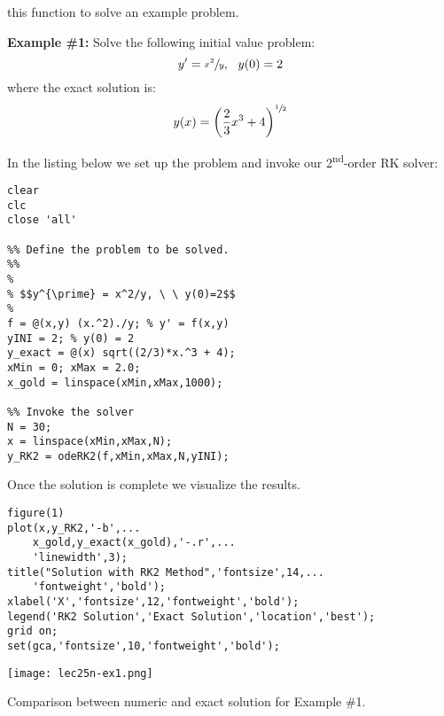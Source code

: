  this function to solve an example problem.

\vspace{0.25cm}

\noindent\textbf{Example \#1:} Solve the following initial value problem:
\begin{equation*}
y^{\prime} = \sfrac{x^2}{y}, \ \ y(0) = 2 
\end{equation*}
where the exact solution is: 
\begin{equation*}
y(x) = \left(\frac{2}{3}x^3 + 4\right)^{\sfrac{1}{2}}
\end{equation*}

\noindent In the listing below we set up the problem and invoke our 2\textsuperscript{nd}-order RK solver:
\begin{lstlisting}[style=myMatlab,name=lec25n-2]
clear
clc
close 'all'

%% Define the problem to be solved.
%%
% 
% $$y^{\prime} = x^2/y, \ \ y(0)=2$$
% 
f = @(x,y) (x.^2)./y; % y' = f(x,y)
yINI = 2; % y(0) = 2
y_exact = @(x) sqrt((2/3)*x.^3 + 4);
xMin = 0; xMax = 2.0;
x_gold = linspace(xMin,xMax,1000);

%% Invoke the solver
N = 30;
x = linspace(xMin,xMax,N);
y_RK2 = odeRK2(f,xMin,xMax,N,yINI);
\end{lstlisting}

\noindent Once the solution is complete we visualize the results.

\vspace{0.25cm}

\begin{lstlisting}[style=myMatlab,name=lec25n-2]
%% Plot the results
figure(1)
plot(x,y_RK2,'-b',...
    x_gold,y_exact(x_gold),'-.r',...
    'linewidth',3);
title("Solution with RK2 Method",'fontsize',14,...
    'fontweight','bold');
xlabel('X','fontsize',12,'fontweight','bold');
legend('RK2 Solution','Exact Solution','location','best');
grid on;
set(gca,'fontsize',10,'fontweight','bold');
\end{lstlisting}

\begin{marginfigure}
\texttt{[image: lec25n-ex1.png]}
\caption{Comparison between numeric and exact solution for Example \#1.}
\label{fig:lec25n-ex1}
\end{marginfigure}


